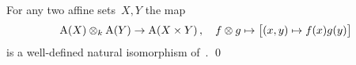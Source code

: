 \begin{proposition}
  \label{regular functions on product of affine sets}
  For any two affine sets~$X,Y$ the map
  \[
            \operatorname{A}(X) \mathbin{\otimes}_k \operatorname{A}(Y)
    \to     \operatorname{A}(X \times Y) \,,
    \quad   f \mathbin{\otimes} g
    \mapsto \big[ (x,y) \mapsto f(x)g(y) \big]
  \]
  is a well-defined natural isomorphism of~.
  \qed
\end{proposition}








